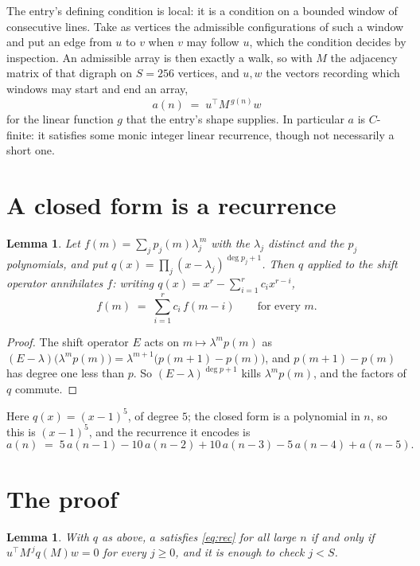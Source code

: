 \documentclass[11pt,a4paper]{article}
\theoremstyle{plain}
\newtheorem{lemma}[theorem]{Lemma}
\theoremstyle{definition}
\begin{document}
The entry's defining condition is local: it is a condition on a bounded window of consecutive lines. Take as vertices the
admissible configurations of such a window and put an edge from $u$ to $v$ when $v$ may
follow $u$, which the condition decides by inspection. An admissible array is then exactly a
walk, so with $M$ the adjacency matrix of that digraph on $S=256$ vertices, and $u,w$ the
vectors recording which windows may start and end an array,
\[
a(n)\;=\;u^{\!\top}M^{\,g(n)}w
\]
for the linear function $g$ that the entry's shape supplies. In particular $a$ is
$C$-finite: it satisfies some monic integer linear recurrence, though not necessarily a short
one.

\section{A closed form is a recurrence}

\begin{lemma}\label{lem:ann}
Let $f(m)=\sum_{j}p_j(m)\lambda_j^{\,m}$ with the $\lambda_j$ distinct and the $p_j$
polynomials, and put $q(x)=\prod_j(x-\lambda_j)^{\deg p_j+1}$. Then $q$ applied to the shift
operator annihilates $f$: writing $q(x)=x^{r}-\sum_{i=1}^{r}c_ix^{r-i}$,
\[
f(m)\;=\;\sum_{i=1}^{r}c_i\,f(m-i)\qquad\text{for every }m.
\]
\end{lemma}

\begin{proof}
The shift operator $E$ acts on $m\mapsto\lambda^{m}p(m)$ as
$(E-\lambda)\bigl(\lambda^{m}p(m)\bigr)=\lambda^{m+1}\bigl(p(m+1)-p(m)\bigr)$, and
$p(m+1)-p(m)$ has degree one less than $p$. So $(E-\lambda)^{\deg p+1}$ kills
$\lambda^{m}p(m)$, and the factors of $q$ commute.
\end{proof}

Here $q(x)=(x-1)^{5}$, of degree $5$; the closed form is a polynomial in $n$, so this is $(x-1)^{5}$, and the recurrence it encodes is
\begin{equation}\label{eq:rec}
a(n)\;=\;5\,a(n-1) - 10\,a(n-2) + 10\,a(n-3) - 5\,a(n-4) + a(n-5).
\end{equation}

\section{The proof}

\begin{lemma}\label{lem:crit}
With $q$ as above, $a$ satisfies \eqref{eq:rec} for all large $n$ if and only if
$u^{\!\top}M^{\,j}q(M)w=0$ for every $j\ge0$, and it is enough to check $j<S$.
\end{lemma}
\end{document}
